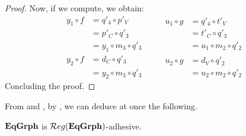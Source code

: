 \begin{proof}
	Now, if we compute, we obtain:
	\[\begin{split}
		y_1 \circ f &= q'_4 \circ p'_V \\ &= p'_C \circ q'_3 \\ &= y_1 \circ m_3 \circ q'_3
	\end{split}
	\qquad
	\begin{split}
		u_1 \circ g &= q'_4 \circ t'_V \\ &= t'_C \circ q'_3 \\ &= u_1 \circ m_2 \circ q'_2
	\end{split}\]
	\[\begin{split}
		y_2 \circ f &= d_C \circ q'_3 \\ &= y_2 \circ m_3 \circ q'_3
	\end{split}
	\qquad
	\begin{split}
		u_2 \circ g &= d_V \circ q'_2 \\ &= u_2 \circ m_2 \circ q'_2
	\end{split}\]
	Concluding the proof.
\end{proof}

From  and , by , we can deduce at once the following.

\begin{cor}\label{cor:eqgrph_reg_adh}
	$\mathbf{EqGrph}$ is $\mathcal{R}eg(\mathbf{EqGrph})$-adhesive.
\end{cor}
